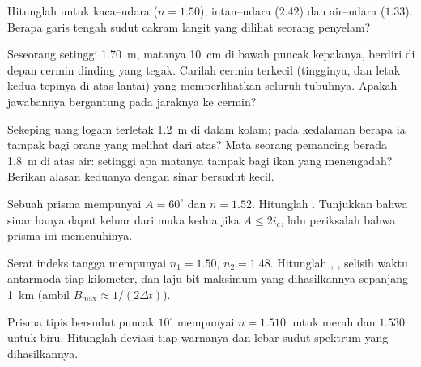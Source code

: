 \begin{exercise}[$\star$]\label{exo:b1:rays-reflection-refraction:3}
Hitunglah  untuk kaca--udara ($n = 1.50$), intan--udara
($2.42$) dan air--udara ($1.33$). Berapa garis tengah sudut cakram
langit yang dilihat seorang penyelam?
\end{exercise}

\begin{exercise}[$\star$]\label{exo:b1:rays-reflection-refraction:4}
Seseorang setinggi \qty{1.70}{m}, matanya \qty{10}{cm} di bawah puncak
kepalanya, berdiri di depan cermin dinding yang tegak. Carilah cermin
terkecil (tingginya, dan letak kedua tepinya di atas lantai) yang
memperlihatkan seluruh tubuhnya. Apakah jawabannya bergantung pada
jaraknya ke cermin?
\end{exercise}

\begin{exercise}[$\star\star$]\label{exo:b1:rays-reflection-refraction:5}
Sekeping uang logam terletak \qty{1.2}{m} di dalam kolam; pada
kedalaman berapa ia tampak bagi orang yang melihat dari atas? Mata
seorang pemancing berada \qty{1.8}{m} di atas air: setinggi apa
matanya tampak bagi ikan yang menengadah? Berikan alasan keduanya
dengan sinar bersudut kecil.
\end{exercise}

\begin{exercise}[$\star\star$]\label{exo:b1:rays-reflection-refraction:6}
Sebuah prisma mempunyai $A = 60^\circ$ dan $n = 1.52$. Hitunglah
. Tunjukkan bahwa sinar hanya dapat keluar dari muka
kedua jika $A \leq 2 i_c$, lalu periksalah bahwa prisma ini memenuhinya.
\end{exercise}

\begin{exercise}[$\star\star$]\label{exo:b1:rays-reflection-refraction:7}
Serat indeks tangga mempunyai $n_1 = 1.50$, $n_2 = 1.48$. Hitunglah
, , selisih waktu antarmoda tiap
kilometer, dan laju bit maksimum yang dihasilkannya sepanjang
\qty{1}{km} (ambil $B_{\max} \approx 1/(2\Delta t)$).
\end{exercise}

\begin{exercise}[$\star\star$]\label{exo:b1:rays-reflection-refraction:8}
Prisma tipis bersudut puncak $10^\circ$ mempunyai $n = 1.510$ untuk
merah dan $1.530$ untuk biru. Hitunglah deviasi tiap warnanya dan lebar
sudut spektrum yang dihasilkannya.
\end{exercise}

